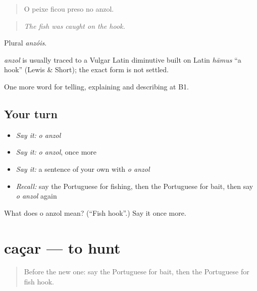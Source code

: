 \begin{quote}
O peixe ficou preso no anzol.
\end{quote}

\begin{quote}
\emph{The fish was caught on the hook.}
\end{quote}

Plural \emph{anzóis}.

\begin{cousinweb}
\emph{anzol} is usually traced to a Vulgar Latin diminutive built on Latin \emph{hāmus} \textquotedblleft{}a hook\textquotedblright{} (Lewis \& Short); the exact form is not settled.
\end{cousinweb}

\begin{grammarlens}[title={What you've built}]
One more word for telling, explaining and describing at B1.
\end{grammarlens}

\subsection*{Your turn}
\begin{itemize}
\raggedright
  \item \emph{Say it:} \emph{o anzol}
  \item \emph{Say it:} \emph{o anzol}, once more
  \item \emph{Say it:} a sentence of your own with \emph{o anzol}
  \item \emph{Recall:} say the Portuguese for fishing, then the Portuguese for bait, then say \emph{o anzol} again
\end{itemize}

\begin{tcolorbox}[breakable,colback=teal!4,colframe=teal!35!black,title={Before you move on}]
What does o anzol mean? (\textquotedblleft{}Fish hook\textquotedblright{}.) Say it once more.
\end{tcolorbox}
\section[caçar]{caçar — to hunt}

\label{lesson:PT-C502-cacar}



\begin{quote}
Before the new one: say the Portuguese for bait, then the Portuguese for fish hook.
\end{quote}

